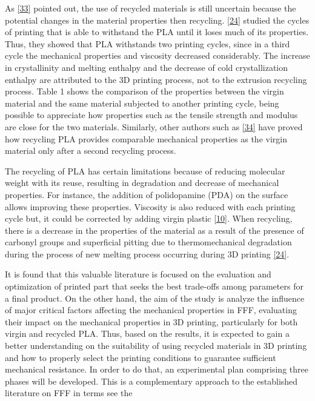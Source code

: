 \documentclass[conference,final,]{IEEEtran}
\begin{document}
As \protect\hyperlink{ref-Suarez2020}{{[}33{]}} pointed out, the use of
recycled materials is still uncertain because the potential changes in
the material properties then recycling.
\protect\hyperlink{ref-Zhao2018}{{[}24{]}} studied the cycles of
printing that is able to withstand the PLA until it loses much of its
properties. Thus, they showed that PLA withstands two printing cycles,
since in a third cycle the mechanical properties and viscosity decreased
considerably. The increase in crystallinity and melting enthalpy and the
decrease of cold crystallization enthalpy are attributed to the 3D
printing process, not to the extrusion recycling process. Table 1 shows
the comparison of the properties between the virgin material and the
same material subjected to another printing cycle, being possible to
appreciate how properties such as the tensile strength and modulus are
close for the two materials. Similarly, other authors such as
\protect\hyperlink{ref-Lanzotti2019}{{[}34{]}} have proved how recycling
PLA provides comparable mechanical properties as the virgin material
only after a second recycling process.

The recycling of PLA has certain limitations because of reducing
molecular weight with its reuse, resulting in degradation and decrease
of mechanical properties. For instance, the addition of polidopamine
(PDA) on the surface allows improving these properties. Viscosity is
also reduced with each printing cycle but, it could be corrected by
adding virgin plastic \protect\hyperlink{ref-Zhao2018a}{{[}10{]}}. When
recycling, there is a decrease in the properties of the material as a
result of the presence of carbonyl groups and superficial pitting due to
thermomechanical degradation during the process of new melting process
occurring during 3D printing \protect\hyperlink{ref-Zhao2018}{{[}24{]}}.

It is found that this valuable literature is focused on the evaluation
and optimization of printed part that seeks the best trade-offs among
parameters for a final product. On the other hand, the aim of the study
is analyze the influence of major critical factors affecting the
mechanical properties in FFF, evaluating their impact on the mechanical
properties in 3D printing, particularly for both virgin and recycled
PLA. Thus, based on the results, it is expected to gain a better
understanding on the suitability of using recycled materials in 3D
printing and how to properly select the printing conditions to guarantee
sufficient mechanical resistance. In order to do that, an experimental
plan comprising three phases will be developed. This is a complementary
approach to the established literature on FFF in terms see the
\end{document}
